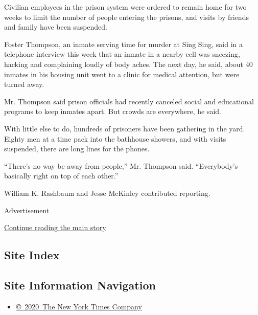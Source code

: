Civilian employees in the prison system were ordered to remain home for
two weeks to limit the number of people entering the prisons, and visits
by friends and family have been suspended.

Foster Thompson, an inmate serving time for murder at Sing Sing, said in
a telephone interview this week that an inmate in a nearby cell was
sneezing, hacking and complaining loudly of body aches. The next day, he
said, about 40 inmates in his housing unit went to a clinic for medical
attention, but were turned away.

Mr. Thompson said prison officials had recently canceled social and
educational programs to keep inmates apart. But crowds are everywhere,
he said.

With little else to do, hundreds of prisoners have been gathering in the
yard. Eighty men at a time pack into the bathhouse showers, and with
visits suspended, there are long lines for the phones.

``There's no way be away from people,'' Mr. Thompson said. ``Everybody's
basically right on top of each other.''

William K. Rashbaum and Jesse McKinley contributed reporting.

Advertisement

\protect\hyperlink{after-bottom}{Continue reading the main story}

\hypertarget{site-index}{%
\subsection{Site Index}\label{site-index}}

\hypertarget{site-information-navigation}{%
\subsection{Site Information
Navigation}\label{site-information-navigation}}

\begin{itemize}
\tightlist
\item
  \href{https://help.nytimes3xbfgragh.onion/hc/en-us/articles/115014792127-Copyright-notice}{©~2020~The
  New York Times Company}
\end{itemize}

